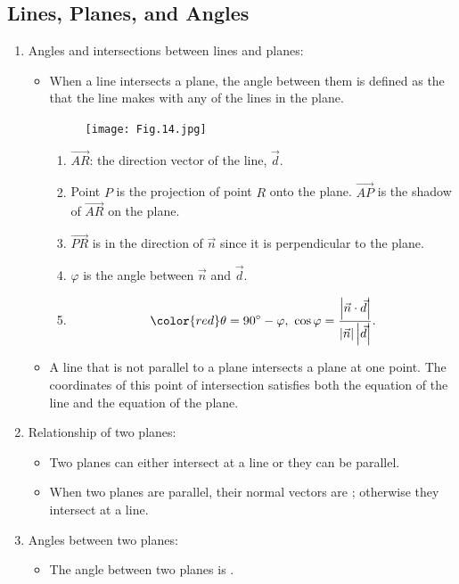 \documentclass[12pt, a4paper]{article}
\begin{document}
\subsection{Lines, Planes, and Angles}
\begin{enumerate}
  \item Angles and intersections between lines and planes: 
  \begin{itemize}
    \item When a line intersects a plane, the angle between them is defined as the {\color{red}{smallest possible angle}} that the line makes with any of the lines in the plane. 
    \begin{figure}[H]
      \centering
      \texttt{[image: Fig.14.jpg]}
    \end{figure}
    \begin{enumerate}
      \item $\overrightarrow{AR}$: the direction vector of the line, $\vec{d}$.
      \item Point $P$ is the projection of point $R$ onto the plane. $\overrightarrow{AP}$ is the shadow of $\overrightarrow{AR}$ on the plane. 
      \item $\overrightarrow{PR}$ is in the direction of $\vec{n}$ since it is perpendicular to the plane. 
      \item $\varphi$ is the angle between $\vec{n}$ and $\vec{d}$. 
      \item $$\color{red} \theta=90^\circ-\varphi,\ \cos\varphi=\frac{\left|\vec{n}\cdot\vec{d}\right|}{\left|\vec{n}\right|\left|\vec{d}\right|}.$$
    \end{enumerate}
    \item A line that is not parallel to a plane intersects a plane at one point. The coordinates of this point of intersection satisfies both the equation of the line and the equation of the plane. 
  \end{itemize}
  \item Relationship of two planes: 
  \begin{itemize}
    \item Two planes can either intersect at a line or they can be parallel.
    \item When two planes are parallel, their normal vectors are {\color{red}{colinear}}; otherwise they intersect at a line. 
  \end{itemize}
  \item Angles between two planes: 
  \begin{itemize}
    \item The angle between two planes is \textbf{\color{red}{the angle between their normal vectors}}.

\end{itemize}
\end{enumerate}
\end{document}
